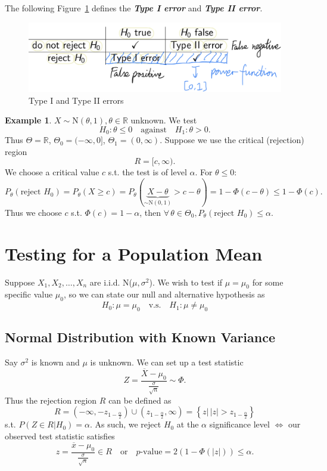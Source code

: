 \documentclass[12pt]{report}
\theoremstyle{definition}
\begin{document}
The following Figure~\ref{error_types} defines the 
\textbf{\emph{Type I error}} and \textbf{\emph{Type II error}}.

\begin{figure}[h]
    \includegraphics[scale=0.22]{./images/error_types.jpeg}
    \centering
    \caption{Type I and Type II errors}\label{error_types}
\end{figure}

\newtheorem{one-sided test eg}[theorem]{Example}
\begin{one-sided test eg}
    $X\sim\text{N}(\theta,1),\theta\in\mathbb{R}$ unknown. We test
    \[
        H_0:\theta\le 0\quad\text{against}\quad
        H_1:\theta>0.
    \]
    Thus $\Theta=\mathbb{R}$, $\Theta_0=(-\infty,0]$,
    $\Theta_1=(0,\infty)$. Suppose we use the critical (rejection) region
    \[
        R=[c,\infty).
    \]
    We choose a critical value $c$ s.t. the test is of level $\alpha$. For
    $\theta\le 0$:
    \[
        P_\theta(\text{reject }H_0)=P_\theta(X\ge c)
        =P_\theta(\underbrace{X-\theta}_{\sim\text{N}(0,1)}>c-\theta)
        =1-\Phi(c-\theta)\le 1-\Phi(c).
    \]
    Thus we choose $c$ s.t. $\Phi(c)=1-\alpha$, then
    $\forall\,\theta\in\Theta_0, P_\theta(\text{reject }H_0)\le\alpha$.
\end{one-sided test eg}

\section{Testing for a Population Mean}

Suppose $X_1,X_2,\ldots,X_n$ are i.i.d. N($\mu,\sigma^{2}$).
We wish to test if $\mu=\mu_0$ for some specific value
$\mu_0$, so we can state our null and alternative hypothesis as
\[
    H_0:\mu=\mu_0\quad\text{v.s.}\quad H_1:\mu\neq\mu_0
\]

\subsection{Normal Distribution with Known Variance}

Say $\sigma^2$ is known and $\mu$ is unknown.
We can set up a test statistic
\[
    Z=\frac{\overline{X}-\mu_0}{\frac{\sigma}{\sqrt{n}}}\sim\Phi.
\]
Thus the rejection region $R$ can be defined as
\[
    R = \left(-\infty,-z_{1-\frac{\alpha}{2}}\right)\cup
    \left(z_{1-\frac{\alpha}{2}},\infty\right)
    = \left\{z\big|\,|z|>z_{1-\frac{\alpha}{2}}\right\}
\]
s.t. $P(Z\in R|H_0)=\alpha$.
As such, we reject $H_0$ at the $\alpha$ significance level $\iff$ our observed
test statistic satisfies
\[
    z=\frac{\overline{x}-\mu_0}{\frac{\sigma}{\sqrt{n}}}\in R
    \quad\text{or}\quad
    p\text{-value}=2\left(1-\Phi(|z|)\right)\le\alpha.
\]
\end{document}
